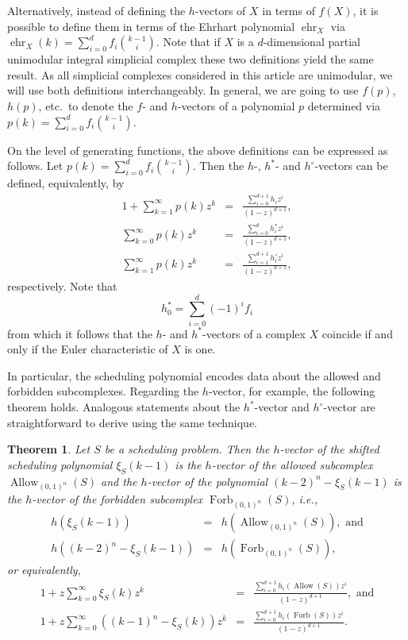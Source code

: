 \documentclass[12pt,reqno]{amsart}
\numberwithin{definition}{section}
\newtheorem{theorem}[definition]{Theorem}
\theoremstyle{definition}
\newcommand{\ehr}{\operatorname{ehr}}
\newcommand{\allow}{\operatorname{Allow}} %
\newcommand{\forb}{\operatorname{Forb}} %
\newcommand{\allowC}{\allow_{(0,1)^n}} %
\newcommand{\forbC}{\forb_{(0,1)^n}} %
\begin{document}
Alternatively, instead of defining the $h$-vectors of $X$ in terms of $f(X)$, it is possible to define them in terms of the Ehrhart polynomial $\ehr_X$ via $\ehr_X(k) = \sum_{i=0}^{d} f_i \binom{k-1}{i}$. Note that if $X$ is a $d$-dimensional partial unimodular integral simplicial complex these two definitions yield the same result. As all simplicial complexes considered in this article are unimodular, we will use both definitions interchangeably. In general, we are going to use $f(p)$, $h(p)$, etc.~to denote the $f$- and $h$-vectors of a polynomial $p$ determined via $p(k)=\sum_{i=0}^{d} f_i \binom{k-1}{i}$.

On the level of generating functions, the above definitions can be expressed as follows. Let $p(k)=\sum_{i=0}^{d} f_i \binom{k-1}{i}$. Then the $h$-, $h^*$- and $h^\circ$-vectors can be defined, equivalently, by 
\begin{eqnarray*}
1 + \sum_{k=1}^\infty p(k) z^k & = &  \frac{\sum_{i=0}^{d+1}h_i z^i}{(1-z)^{d+1}}, \\
\sum_{k=0}^\infty p(k) z^k & = &  \frac{\sum_{i=0}^{d}h^*_i z^i}{(1-z)^{d+1}}, \\
\sum_{k=1}^\infty p(k) z^k & = &  \frac{\sum_{i=1}^{d+1}h^\circ_i z^i}{(1-z)^{d+1}},
\end{eqnarray*}
respectively. Note that 
\[ 
h^*_0=\sum_{i=0}^d (-1)^i f_i
\]
from which it follows that the $h$- and $h^*$-vectors of a complex $X$ coincide if and only if the Euler characteristic of $X$ is one.

In particular, the scheduling polynomial encodes data about the allowed and forbidden subcomplexes. Regarding the $h$-vector, for example, the following theorem holds. Analogous statements about the $h^*$-vector and $h^\circ$-vector are straightforward to derive using the same technique.

\begin{theorem}
\label{Hilbert}
Let $S$ be a scheduling problem. Then the $h$-vector of the shifted scheduling polynomial $\xi_S(k-1)$ is the $h$-vector of the allowed subcomplex $\allowC(S)$ and the $h$-vector of the polynomial $(k-2)^n-\xi_S(k-1)$ is the $h$-vector of the forbidden subcomplex $\forbC(S)$, i.e.,
\begin{eqnarray*}
  h(\xi_S(k-1)) &=& h(\allowC(S)),   \text{ and}\\
  h((k-2)^n - \xi_S(k-1)) &=& h(\forbC(S)),
\end{eqnarray*}
or equivalently,
\begin{eqnarray*}
 1 + z\sum_{k = 0}^\infty \xi_S(k) z^k &=& \frac{\sum_{i=0}^{d+1} h_i(\allow(S)) z^i}{(1-z)^{d+1}}, \text{ and} \\
 1 + z\sum_{k = 0}^\infty \left( (k-1)^n - \xi_S(k) \right) z^k &=& \frac{\sum_{i=0}^{d+1} h_i(\forb(S)) z^i}{(1-z)^{d+1}}.
\end{eqnarray*}
\end{theorem}
\end{document}
